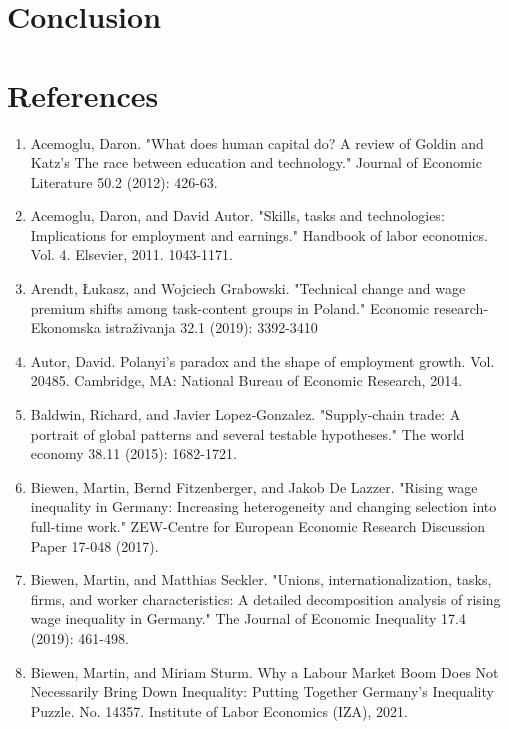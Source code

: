 \documentclass{article}
\begin{document}
\section{Conclusion}

\section{References}
\begin{enumerate}
\item Acemoglu, Daron. "What does human capital do? A review of Goldin and Katz's The race between education and technology." Journal of Economic Literature 50.2 (2012): 426-63.

\item Acemoglu, Daron, and David Autor. "Skills, tasks and technologies: Implications for employment and earnings." Handbook of labor economics. Vol. 4. Elsevier, 2011. 1043-1171.

\item Arendt, Łukasz, and Wojciech Grabowski. "Technical change and wage premium shifts among task-content groups in Poland." Economic research-Ekonomska istraživanja 32.1 (2019): 3392-3410

\item Autor, David. Polanyi's paradox and the shape of employment growth. Vol. 20485. Cambridge, MA: National Bureau of Economic Research, 2014.

\item Baldwin, Richard, and Javier Lopez‐Gonzalez. "Supply‐chain trade: A portrait of global patterns and several testable hypotheses." The world economy 38.11 (2015): 1682-1721.

\item Biewen, Martin, Bernd Fitzenberger, and Jakob De Lazzer. "Rising wage inequality in Germany: Increasing heterogeneity and changing selection into full-time work." ZEW-Centre for European Economic Research Discussion Paper 17-048 (2017).

\item Biewen, Martin, and Matthias Seckler. "Unions, internationalization, tasks, firms, and worker characteristics: A detailed decomposition analysis of rising wage inequality in Germany." The Journal of Economic Inequality 17.4 (2019): 461-498.

\item Biewen, Martin, and Miriam Sturm. Why a Labour Market Boom Does Not Necessarily Bring Down Inequality: Putting Together Germany's Inequality Puzzle. No. 14357. Institute of Labor Economics (IZA), 2021.


\end{enumerate}
\end{document}
